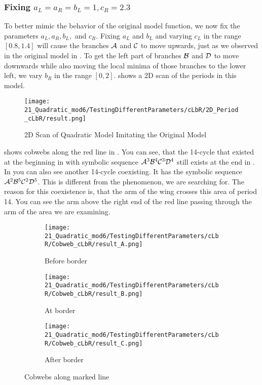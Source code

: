 \subsubsection{Fixing $a_L = a_R = b_L = 1, c_R = 2.3$}

To better mimic the behavior of the original model function, we now fix the parameters $a_L, a_R, b_L,$ and $c_R$.
Fixing $a_L$ and $b_L$ and varying $c_L$ in the range $[0.8, 1.4]$ will cause the branches $\mathcal{A}$ and $\mathcal{C}$ to move upwards, just as we observed in the original model in .
To get the left part of branches $\mathcal{B}$ and $\mathcal{D}$ to move downwards while also moving the local minima of those branches to the lower left, we vary $b_R$ in the range $[0, 2]$.
 shows a 2D scan of the periods in this model.


\begin{figure}
    \centering
    \texttt{[image: 21\_Quadratic\_mod6/TestingDifferentParameters/cLbR/2D\_Period\_cLbR/result.png]}
    \caption{2D Scan of Quadratic Model Imitating the Original Model}
    \label{fig:quadratic.full.cLbR.2d.full}
\end{figure}

 shows cobwebs along the red line in .
You can see, that the 14-cycle that existed at the beginning in  with symbolic sequence $\mathcal{A}^3\mathcal{B}^4\mathcal{C}^3\mathcal{D}^4$ still exists at the end in .
In  you can also see another 14-cycle coexisting.
It has the symbolic sequence $\mathcal{A}^2\mathcal{B}^5\mathcal{C}^2\mathcal{D}^5$.
This is different from the phenomenon, we are searching for.
The reason for this coexistence is, that the arm of the wing crosses this area of period 14.
You can see the arm above the right end of the red line passing through the arm of the area we are examining.

\begin{figure}
    \centering
    \begin{subfigure}{0.3\textwidth}
        \centering
        \texttt{[image: 21\_Quadratic\_mod6/TestingDifferentParameters/cLbR/Cobweb\_cLbR/result\_A.png]}
        \caption{Before border}
        \label{fig:quad.full.cLbR.CobwebA}
    \end{subfigure}
    \begin{subfigure}{0.3\textwidth}
        \centering
        \texttt{[image: 21\_Quadratic\_mod6/TestingDifferentParameters/cLbR/Cobweb\_cLbR/result\_B.png]}
        \caption{At border}
        \label{fig:quad.full.cLbR.CobwebB}
    \end{subfigure}
    \begin{subfigure}{0.3\textwidth}
        \centering
        \texttt{[image: 21\_Quadratic\_mod6/TestingDifferentParameters/cLbR/Cobweb\_cLbR/result\_C.png]}
        \caption{After border}
        \label{fig:quad.full.cLbR.CobwebC}
    \end{subfigure}
    \caption{Cobwebs along marked line}
    \label{fig:quad.full.cLbR.Cobwebs}
\end{figure}

